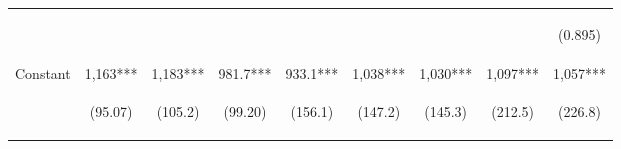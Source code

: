 \documentclass[10pt,letterpaper,subeqn, xcolor=table]{beamer}
\begin{document}
\begin{frame}[label=otherPANEL]
\begin{table}[htpb!]
\begin{center}
{\begin{tabular}{lcccccccc}
        & \begin{footnotesize}\end{footnotesize} & \begin{footnotesize}\end{footnotesize} & \begin{footnotesize}\end{footnotesize} & \begin{footnotesize}\end{footnotesize} & \begin{footnotesize}\end{footnotesize} & \begin{footnotesize}\end{footnotesize} & \begin{footnotesize}\end{footnotesize} & \begin{footnotesize}(0.895)\end{footnotesize} \\

        Constant&1,163***&1,183***&981.7***&933.1***&1,038***&1,030***&1,097***&1,057***\\

        & \begin{footnotesize}(95.07)\end{footnotesize} & \begin{footnotesize}(105.2)\end{footnotesize} & \begin{footnotesize}(99.20)\end{footnotesize} & \begin{footnotesize}(156.1)\end{footnotesize} & \begin{footnotesize}(147.2)\end{footnotesize} & \begin{footnotesize}(145.3)\end{footnotesize} & \begin{footnotesize}(212.5)\end{footnotesize} & \begin{footnotesize}(226.8)\end{footnotesize} \\


\end{tabular}}
\end{center}
\end{table}
\end{frame}
\end{document}
